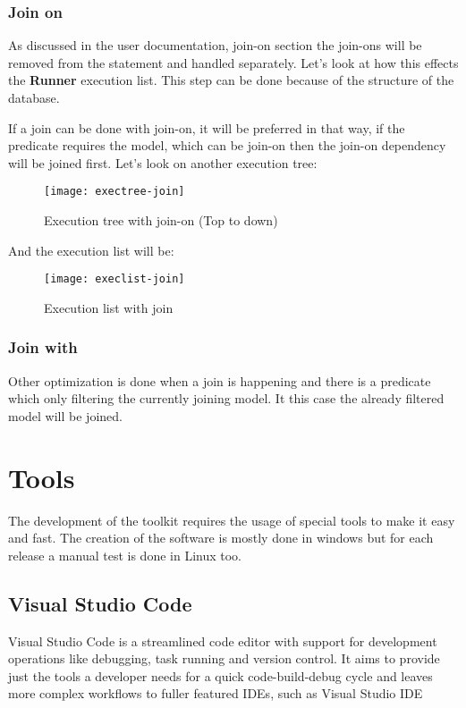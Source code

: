 \newpage
\subsubsection{Join on}
As discussed in the user documentation, join-on section the join-ons will be removed from the statement and handled separately. Let’s look at how this effects the \textbf{Runner} execution list. This step can be done because of the structure of the database.

If a join can be done with join-on, it will be preferred in that way, if the predicate requires the model, which can be join-on then the join-on dependency will be joined first. Let’s look on another execution tree:

\begin{figure}[H]
	\centering
	\texttt{[image: exectree-join]}
	\caption{Execution tree with join-on (Top to down)}
	\label{fig:fig-tree}
\end{figure}

And the execution list will be:

\begin{figure}[H]
	\centering
	\texttt{[image: execlist-join]}
	\caption{Execution list with join}
	\label{fig:fig-joine}
\end{figure}

\subsubsection{Join with}
Other optimization is done when a join is happening and there is a predicate which only filtering the currently joining model. It this case the already filtered model will be joined.

\section{Tools}

The development of the toolkit requires the usage of special tools to make it easy and fast. The creation of the software is mostly done in windows but for each release a manual test is done in Linux too.

\subsection{Visual Studio Code}

Visual Studio Code is a streamlined code editor with support for development operations like debugging, task running and version control. It aims to provide just the tools a developer needs for a quick code-build-debug cycle and leaves more complex workflows to fuller featured IDEs, such as Visual Studio IDE\cite{vscode}


